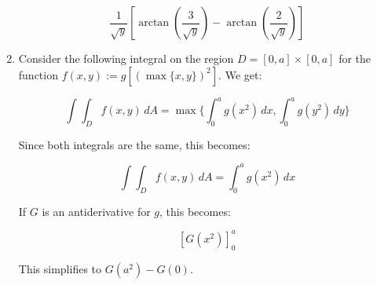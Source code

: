 \documentclass[10pt]{amsart}
\begin{document}
\begin{enumerate}
  $$\frac{1}{\sqrt{y}} \left[\arctan\left(\frac{3}{\sqrt{y}}\right) - \arctan\left(\frac{2}{\sqrt{y}}\right)\right]$$

\item Consider the following integral on the region $D = [0,a] \times
  [0,a]$ for the function $f(x,y) := g[(\max \{ x,y \})^2]$. We get:

  $$\int \int_D f(x,y) \, dA = \max \{ \int_0^a g(x^2) \, dx, \int_0^a g(y^2) \, dy \}$$

  Since both integrals are the same, this becomes:

  $$\int \int_D f(x,y) \, dA = \int_0^a g(x^2) \, dx$$

  If $G$ is an antiderivative for $g$, this becomes:

  $$[G(x^2)]_0^a$$

  This simplifies to $G(a^2) - G(0)$.
\end{enumerate}
\end{document}
